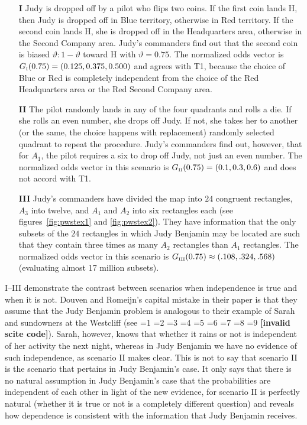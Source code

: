 \documentclass[smallextended]{svjour3}       %
\newcommand{\qvu}[0]{\vartheta}
\newcommand{\PageP}{p.~}
\newcommand{\PageP}{}
\newcommand{\scite}[3]{\ifnum#1=1\cite{#2}\else
\ifnum#1=2\cite[{\PageP}~#3]{#2}\else
\ifnum#1=3\cite[{\PageP}~#3]{#2}\else
\ifnum#1=4\cite{#2}\else
\ifnum#1=5\cite{#2}\else
\ifnum#1=6\cite[{\PageP}~#3]{#2}\else
\ifnum#1=7\cite{#2}\else
\ifnum#1=8\cite[{\PageP}~#3]{#2}\else
\ifnum#1=9\cite[{\PageP}~#3]{#2}\else
\textbf{[invalid scite code]}\fi\fi\fi\fi\fi\fi\fi\fi\fi}
\begin{document}
\begin{enumerate}
\item[\textbf{I}] Judy is dropped off by a pilot who flips two
  coins. If the first coin lands H, then Judy is dropped off in Blue
  territory, otherwise in Red territory. If the second coin lands H,
  she is dropped off in the Headquarters area, otherwise in the
  Second Company area. Judy's commanders find out that the second coin
  is biased ${\qvu}:1-{\qvu}$ toward H with ${\qvu}=0.75$. The normalized odds
  vector is $G_{\mbox{\tiny I}}(0.75)=(0.125,0.375,0.500)$ and agrees
  with T1, because the choice of Blue or Red is completely independent
  from the choice of the Red Headquarters area or the Red Second
  Company area.
\item[\textbf{II}] The pilot randomly lands in any of the four
  quadrants and rolls a die. If she rolls an even number, she drops
  off Judy. If not, she takes her to another (or the same, the choice
  happens with replacement) randomly selected quadrant to repeat the
  procedure. Judy's commanders find out, however, that for $A_{1}$,
  the pilot requires a six to drop off Judy, not just an even number.
  The normalized odds vector in this scenario is $G_{\mbox{\tiny
      II}}(0.75)=(0.1,0.3,0.6)$ and does not accord with T1.
\item[\textbf{III}] Judy's commanders have divided the map into $24$
  congruent rectangles, $A_{3}$ into twelve, and $A_{1}$ and $A_{2}$
  into six rectangles each (see figures~\ref{fig:pwstex1} and
  \ref{fig:pwstex2}). They have information that the only subsets of
  the $24$ rectangles in which Judy Benjamin may be located are such
  that they contain three times as many $A_{2}$ rectangles than
  $A_{1}$ rectangles. The normalized odds vector in this scenario is
  $G_{\mbox{\tiny III}}(0.75)\approx(.108,.324,.568)$ (evaluating almost
  17 million subsets).
\end{enumerate}

I--III demonstrate the contrast between scenarios when independence is
true and when it is not. Douven and Romeijn's capital mistake in their
paper is that they assume that the Judy Benjamin problem is analogous
to their example of Sarah and sundowners at the Westcliff (see
\scite{8}{douvenromeijn09}{7}). Sarah, however, knows that whether it
rains or not is independent of her activity the next night, whereas in
Judy Benjamin we have no evidence of such independence, as scenario II
makes clear. This is not to say that scenario II is the scenario that
pertains in Judy Benjamin's case. It only says that there is no
natural assumption in Judy Benjamin's case that the probabilities are
independent of each other in light of the new evidence, for scenario
II is perfectly natural (whether it is true or not is a completely
different question) and reveals how dependence is consistent with the
information that Judy Benjamin receives.
\end{document}
